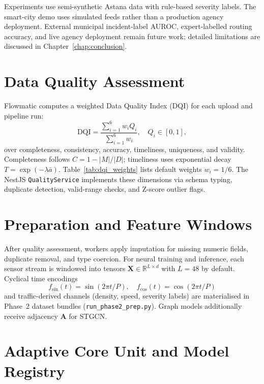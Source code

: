 Experiments use semi-synthetic Astana data with rule-based severity labels. The smart-city demo uses simulated feeds rather than a production agency deployment. External municipal incident-label AUROC, expert-labelled routing accuracy, and live agency deployment remain future work; detailed limitations are discussed in Chapter~\ref{chap:conclusion}.

\section{Data Quality Assessment}

Flowmatic computes a weighted Data Quality Index (DQI) for each upload and pipeline run:
\begin{equation}
\label{eq:dqi}
\mathrm{DQI} = \frac{\sum_{i=1}^{6} w_i Q_i}{\sum_{i=1}^{6} w_i}, \quad Q_i \in [0,1],
\end{equation}
over completeness, consistency, accuracy, timeliness, uniqueness, and validity. Completeness follows $C = 1 - |M|/|D|$; timeliness uses exponential decay $T = \exp(-\lambda \bar{a})$. Table~\ref{tab:dqi_weights} lists default weights $w_i = 1/6$. The NestJS \texttt{QualityService} implements these dimensions via schema typing, duplicate detection, valid-range checks, and Z-score outlier flags.



\section{Preparation and Feature Windows}

After quality assessment, workers apply imputation for missing numeric fields, duplicate removal, and type coercion. For neural training and inference, each sensor stream is windowed into tensors $\mathbf{X} \in \mathbb{R}^{L \times d}$ with $L=48$ by default. Cyclical time encodings
\begin{equation}
f_{\sin}(t) = \sin(2\pi t/P), \quad f_{\cos}(t) = \cos(2\pi t/P)
\end{equation}
and traffic-derived channels (density, speed, severity labels) are materialised in Phase~2 dataset bundles (\texttt{run\_phase2\_prep.py}). Graph models additionally receive adjacency $\mathbf{A}$ for STGCN.

\section{Adaptive Core Unit and Model Registry}

